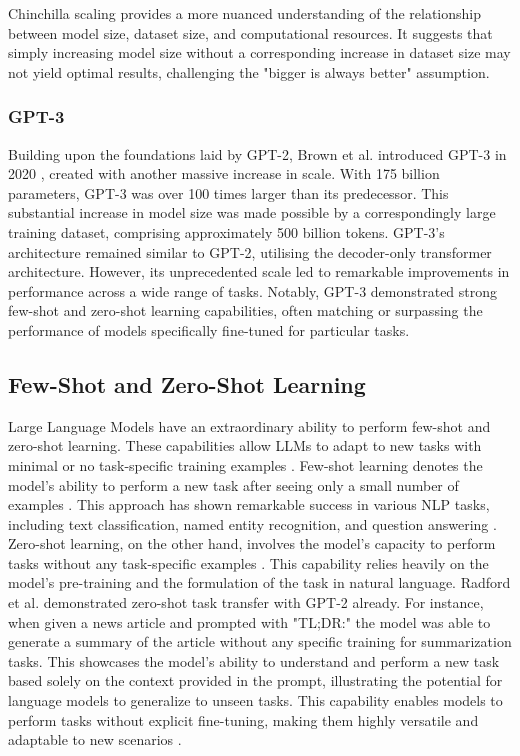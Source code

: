 \documentclass[a4paper, oneside]{discothesis}
\begin{document}
Chinchilla scaling provides a more nuanced understanding of the relationship between model size, dataset size, and computational resources. It suggests that simply increasing model size without a corresponding increase in dataset size may not yield optimal results, challenging the "bigger is always better" assumption.

\subsubsection{GPT-3}
Building upon the foundations laid by GPT-2, Brown et al. introduced GPT-3 in 2020 \cite{brown2020language}, created with another massive increase in scale. With 175 billion parameters, GPT-3 was over 100 times larger than its predecessor. 
This substantial increase in model size was made possible by a correspondingly large training dataset, comprising approximately 500 billion tokens.
GPT-3's architecture remained similar to GPT-2, utilising the decoder-only transformer architecture. 
However, its unprecedented scale led to remarkable improvements in performance across a wide range of tasks. Notably, GPT-3 demonstrated strong few-shot and zero-shot learning capabilities, often matching or surpassing the performance of models specifically fine-tuned for particular tasks.

\subsection{Few-Shot and Zero-Shot Learning}
Large Language Models have an extraordinary ability to perform few-shot and zero-shot learning. These capabilities allow LLMs to adapt to new tasks with minimal or no task-specific training examples \cite{brown2020language}.
Few-shot learning denotes the model's ability to perform a new task after seeing only a small number of examples \cite{wang2020generalising}. This approach has shown remarkable success in various NLP tasks, including text classification, named entity recognition, and question answering \cite{gao2021making}. 
Zero-shot learning, on the other hand, involves the model's capacity to perform tasks without any task-specific examples \cite{xian2018zero}. 
This capability relies heavily on the model's pre-training and the formulation of the task in natural language. 
Radford et al. \cite{radford2019language} demonstrated zero-shot task transfer with GPT-2 already. For instance, when given a news article and prompted with "TL;DR:" the model was able to generate a summary of the article without any specific training for summarization tasks. This showcases the model's ability to understand and perform a new task based solely on the context provided in the prompt, illustrating the potential for language models to generalize to unseen tasks. This capability enables models to perform tasks without explicit fine-tuning, making them highly versatile and adaptable to new scenarios \cite{min2022rethinking}.
\end{document}

